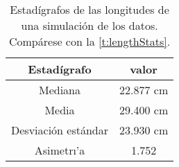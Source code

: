 \begin{table}[H]
	\centering
	\begin{tabular}{ |c|c|}
		\hline
		Estad\'igrafo         & valor  \\ \hline\hline
		Mediana             & 22.877 cm \\ \hline
		Media               & 29.400 cm \\ \hline
		Desviaci\'on est\'andar & 23.930 cm \\ \hline
		Asimetr\i'a           & 1.752  \\ \hline
	\end{tabular}
	\caption{Estad\'igrafos de las longitudes de una simulaci\'on de los datos. Comp\'arese con la \autoref{t:lengthStats}.}
	\label{t:lengthStatsSim}
\end{table}

